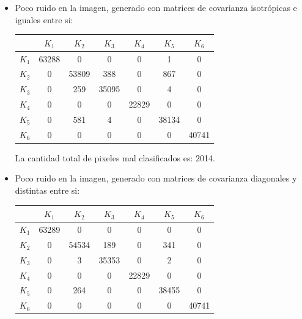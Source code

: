 \begin{itemize}

\item Poco ruido en la imagen, generado con matrices de covarianza isotrópicas e iguales entre si:
\begin{center}
\begin{tabular}{c|c|c|c|c|c|c|}
    \cline{2-7}
     & \textcolor{lg}{$K_{1}$} & \textcolor{br}{$K_{2}$} & \textcolor{rr}{$K_{3}$} & \textcolor{dg}{$K_{4}$} & \textcolor{yy}{$K_{5}$} & \textcolor{bb}{$K_{6}$} \\
    \hline
    \multicolumn{1}{|c|}{\textcolor{lg}{$K_{1}$}} & 63288 & 0     & 0     & 0     & 1     & 0     \\
    \multicolumn{1}{|c|}{\textcolor{br}{$K_{2}$}} & 0     & 53809 & 388   & 0     & 867   & 0     \\
    \multicolumn{1}{|c|}{\textcolor{rr}{$K_{3}$}} & 0     & 259   & 35095 & 0     & 4     & 0     \\
    \multicolumn{1}{|c|}{\textcolor{dg}{$K_{4}$}} & 0     & 0     & 0     & 22829 & 0     & 0     \\
    \multicolumn{1}{|c|}{\textcolor{yy}{$K_{5}$}} & 0     & 581   & 4     & 0     & 38134 & 0     \\
    \multicolumn{1}{|c|}{\textcolor{bb}{$K_{6}$}} & 0     & 0     & 0     & 0     & 0     & 40741 \\
    \hline
\end{tabular}
\end{center}

La cantidad total de pixeles mal clasificados es: 2014.
 
\item Poco ruido en la imagen, generado con matrices de covarianza diagonales y distintas entre si:
\begin{center}
\begin{tabular}{c|c|c|c|c|c|c|}
    \cline{2-7}
     & \textcolor{lg}{$K_{1}$} & \textcolor{br}{$K_{2}$} & \textcolor{rr}{$K_{3}$} & \textcolor{dg}{$K_{4}$} & \textcolor{yy}{$K_{5}$} & \textcolor{bb}{$K_{6}$} \\
    \hline
    \multicolumn{1}{|c|}{\textcolor{lg}{$K_{1}$}} & 63289 & 0     & 0     & 0     & 0     & 0     \\
    \multicolumn{1}{|c|}{\textcolor{br}{$K_{2}$}} & 0     & 54534 & 189   & 0     & 341   & 0     \\
    \multicolumn{1}{|c|}{\textcolor{rr}{$K_{3}$}} & 0     & 3     & 35353 & 0     & 2     & 0     \\
    \multicolumn{1}{|c|}{\textcolor{dg}{$K_{4}$}} & 0     & 0     & 0     & 22829 & 0     & 0     \\
    \multicolumn{1}{|c|}{\textcolor{yy}{$K_{5}$}} & 0     & 264   & 0     & 0     & 38455 & 0     \\
    \multicolumn{1}{|c|}{\textcolor{bb}{$K_{6}$}} & 0     & 0     & 0     & 0     & 0     & 40741 \\
    \hline
\end{tabular}
\end{center}
 

\end{itemize}
